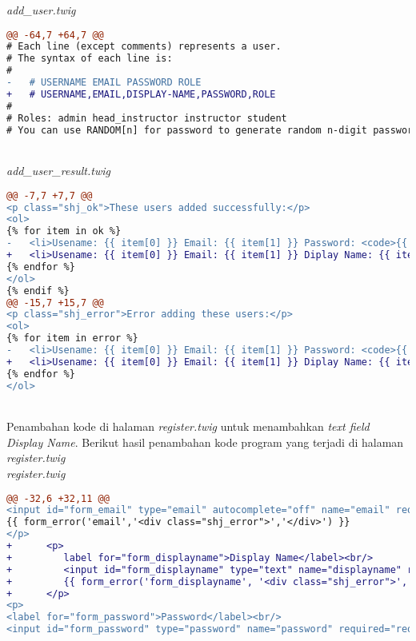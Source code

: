 \textit{add\_user.twig}
\begin{lstlisting}[language=diff, basicstyle=\ttfamily, frame=single,
columns=fullflexible, keepspaces=true, breaklines=true]
@@ -64,7 +64,7 @@
# Each line (except comments) represents a user.
# The syntax of each line is:
#
-   # USERNAME EMAIL PASSWORD ROLE
+   # USERNAME,EMAIL,DISPLAY-NAME,PASSWORD,ROLE
#
# Roles: admin head_instructor instructor student
# You can use RANDOM[n] for password to generate random n-digit password.
\end{lstlisting}
~\\
\textit{add\_user\_result.twig}
\begin{lstlisting}[language=diff, basicstyle=\ttfamily, frame=single,
columns=fullflexible, keepspaces=true, breaklines=true]
@@ -7,7 +7,7 @@
<p class="shj_ok">These users added successfully:</p>
<ol>
{% for item in ok %}
-   <li>Usename: {{ item[0] }} Email: {{ item[1] }} Password: <code>{{ item[2] }}</code> Role: {{ item[3] }}</li>
+   <li>Usename: {{ item[0] }} Email: {{ item[1] }} Diplay Name: {{ item[2] }} Password: <code>{{ item[3] }}</code> Role: {{ item[4] }} </li>
{% endfor %}
</ol>
{% endif %}
@@ -15,7 +15,7 @@
<p class="shj_error">Error adding these users:</p>
<ol>
{% for item in error %}
-   <li>Usename: {{ item[0] }} Email: {{ item[1] }} Password: <code>{{ item[2] }}</code> Role: {{ item[3] }} ({{ item[4] }})</li>
+   <li>Usename: {{ item[0] }} Email: {{ item[1] }} Diplay Name: {{ item[2] }} Password: <code>{{ item[3] }}</code> Role: {{ item[4] }} ({{ item[5] }})</li>
{% endfor %}
</ol>
\end{lstlisting}
~\\
Penambahan kode di halaman \textit{register.twig} untuk menambahkan \textit{text field Display Name}. Berikut hasil penambahan kode program yang terjadi di halaman \textit{register.twig}\\
\textit{register.twig}
\begin{lstlisting}[language=diff, basicstyle=\ttfamily, frame=single,
columns=fullflexible, keepspaces=true, breaklines=true]
@@ -32,6 +32,11 @@
<input id="form_email" type="email" autocomplete="off" name="email" required="required" class="sharif_input" value="{{ set_value('email') }}"/>
{{ form_error('email','<div class="shj_error">','</div>') }}
</p>
+      <p>
+         label for="form_displayname">Display Name</label><br/>
+         <input id="form_displayname" type="text" name="displayname" required="required" pattern="[A-Za-z\s]+" title="The Display Name field must be contain only alphabetical letters" class="sharif_input" value="{{ set_value('displayname') }}"/>
+         {{ form_error('form_displayname', '<div class="shj_error">', '</div>') }}
+      </p>
<p>
<label for="form_password">Password</label><br/>
<input id="form_password" type="password" name="password" required="required" pattern=".{6,200}" title="The Password field must be at least 6 characters in length" class="sharif_input"/>
\end{lstlisting}


